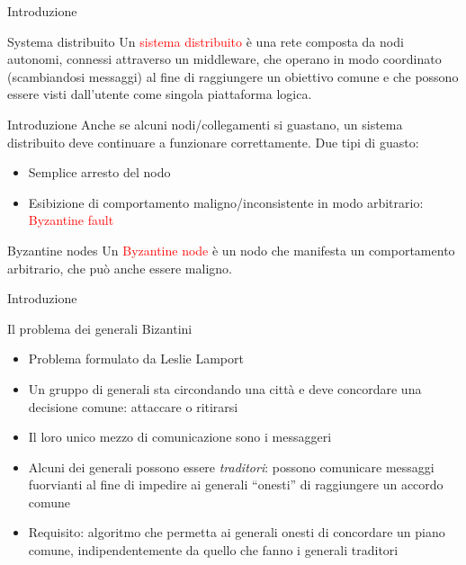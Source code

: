 \documentclass{beamer}
\newcommand\red[1]{\textcolor{red}{#1}}
\begin{document}
\begin{frame}{Introduzione}
    \begin{block}{Systema distribuito}
    Un \textcolor{red}{sistema distribuito} è una rete composta da nodi autonomi, connessi attraverso un middleware, che operano in modo coordinato (scambiandosi messaggi) al fine di raggiungere un obiettivo comune e che possono essere visti dall'utente come singola piattaforma logica.  
    \end{block}
\end{frame}


  \begin{frame}{Introduzione}
    Anche se alcuni nodi/collegamenti si guastano, un sistema distribuito deve continuare a funzionare correttamente. Due tipi di guasto: 
    \begin{itemize}
      \item Semplice arresto del nodo
      \item Esibizione di comportamento maligno/inconsistente in modo arbitrario: \red{Byzantine fault}
    \end{itemize}

    \pause 
    \begin{block}{Byzantine nodes}
      Un \textcolor{red}{Byzantine node} è un nodo che manifesta un comportamento arbitrario, che può anche essere maligno. 
    \end{block}
  \end{frame}
  
  
  
  
  \begin{frame}{Introduzione}
        \begin{block}{Il problema dei generali Bizantini}
          \begin{itemize}
            \item Problema formulato da Leslie Lamport \cite{lamport1982byzantine}
            \item Un gruppo di generali sta circondando una città e deve concordare una decisione comune: attaccare o ritirarsi
            \item Il loro unico mezzo di comunicazione sono i messaggeri 
            \item Alcuni dei generali possono essere \emph{traditori}: possono comunicare messaggi fuorvianti al fine di impedire ai generali ``onesti'' di raggiungere un accordo comune
            \item Requisito: algoritmo che permetta ai generali onesti di concordare un piano comune, indipendentemente da quello che fanno i generali traditori
          \end{itemize}
        \end{block}
    \end{frame}
\end{document}
